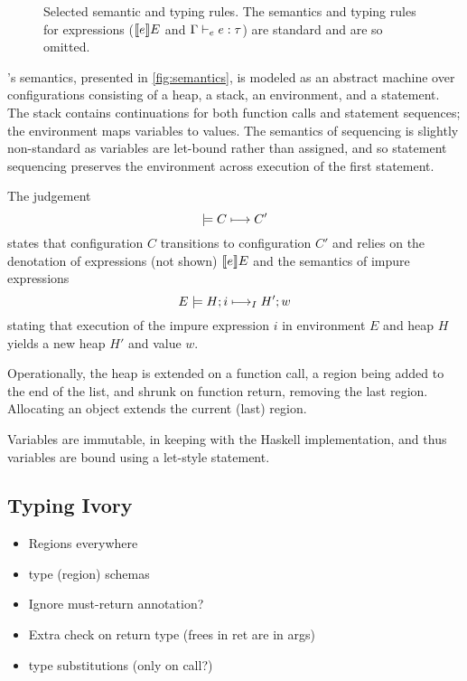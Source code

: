 \begin{figure*}[ht]
\begin{mathpar}
\end{mathpar}

\label{fig:rules}
\caption{Selected semantic and typing rules. The semantics and typing rules for expressions ($\denoteexp{e}{E}$ and $\wfexp{\Gamma}{e}{\tau}$) are standard and are so omitted.}
\end{figure*}



 \coreivory{}'s semantics,
presented in \autoref{fig:semantics}, is modeled as an abstract
machine over configurations consisting of a heap, a stack,
an environment, and a statement. The stack contains continuations for
both function calls and statement sequences; the environment maps
variables to values. The semantics of sequencing is slightly
non-standard as variables are let-bound rather than assigned, and so
statement sequencing preserves the environment across execution of the
first statement.

The judgement
\[
\stepsX{C}{C'}
\]
states that configuration $C$ transitions to configuration $C'$ and
relies on the denotation of expressions (not shown) $\denoteexp{e}{E}$
and the semantics of impure expressions
\[
\hsteps{E}{H}{i}{H'}{w}
\]
stating that execution of the impure expression $i$ in environment $E$
and heap $H$ yields a new heap $H'$ and value $w$.


Operationally, the heap is extended on a function call, a
region being added to the end of the list, and shrunk on function
return, removing the last region.  Allocating an object extends the
current (last) region.

Variables are immutable, in keeping with the Haskell implementation,
and thus variables are bound using a let-style statement.


\subsection{Typing Ivory}

\begin{itemize}
\item Regions everywhere
\item type (region) schemas
\item Ignore must-return annotation?
\item Extra check on return type (frees in ret are in args) 
\item type substitutions (only on call?)
\end{itemize}

